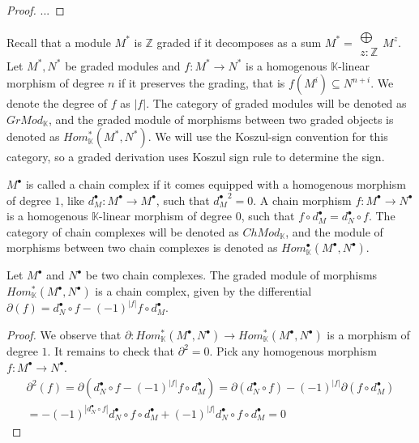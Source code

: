 \documentclass[../thesis.tex]{subfiles}
\begin{document}
            \begin{proof}
                ...
            \end{proof}

            Recall that a module $M^*$ is $\mathbb{Z}$ graded if it decomposes as a sum $M^* = \substack{\bigoplus \\ z:\mathbb{Z}}M^z$. Let $M^*,N^*$ be graded modules and $f:M^*\rightarrow N^*$ is a homogenous $\mathbb{K}$-linear morphism of degree $n$ if it preserves the grading, that is $f(M^i) \subseteq N^{n+i}$. We denote the degree of $f$ as $|f|$. The category of graded modules will be denoted as $GrMod_{\mathbb{K}}$, and the graded module of morphisms between two graded objects is denoted as $Hom_{\mathbb{K}}^*(M^*,N^*)$. We will use the Koszul-sign convention for this category, so a graded derivation uses Koszul sign rule to determine the sign.
            

            $M^{\bullet}$ is called a chain complex if it comes equipped with a homogenous morphism of degree $1$, like $d_M^{\bullet}:M^{\bullet}\rightarrow M^{\bullet}$, such that ${d_M^{\bullet}}^2=0$. A chain morphism $f: M^{\bullet}\rightarrow N^{\bullet}$ is a homogenous $\mathbb{K}$-linear morphism of degree $0$, such that $f\circ d_M^{\bullet} = d_N^{\bullet}\circ f$. The category of chain complexes will be denoted as $ChMod_{\mathbb{K}}$, and the module of morphisms between two chain complexes is denoted as $Hom_{\mathbb{K}}^{\bullet}(M^{\bullet},N^{\bullet})$.

            \begin{proposition}
                Let $M^{\bullet}$ and $N^{\bullet}$ be two chain complexes. The graded module of morphisms $Hom_{\mathbb{K}}^*(M^{\bullet},N^{\bullet})$ is a chain complex, given by the differential $\partial(f) = d_N^{\bullet}\circ f - (-1)^{|f|}f\circ d_M^{\bullet}$.
            \end{proposition}

            \begin{proof}
                We observe that $\partial : Hom_{\mathbb{K}}^*(M^{\bullet},N^{\bullet}) \rightarrow Hom_{\mathbb{K}}^*(M^{\bullet},N^{\bullet})$ is a morphism of degree $1$. It remains to check that $\partial^2 = 0$. Pick any homogenous morphism $f : M^{\bullet}\rightarrow N^{\bullet}$.
                \begin{multline*}
                    \partial^2(f) = \partial(d_N^{\bullet}\circ f - (-1)^{|f|}f\circ d_M^{\bullet}) = \partial(d_N^{\bullet}\circ f) - (-1)^{|f|}\partial(f\circ d_M^{\bullet}) \\ = - (-1)^{|d_N^{\bullet}\circ f|}d_N^{\bullet}\circ f\circ d_M^{\bullet} + (-1)^{|f|}d_N^{\bullet}\circ f\circ d_M^{\bullet} = 0
                \end{multline*}
            \end{proof}
\end{document}
